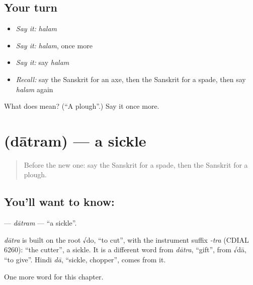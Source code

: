 \subsection*{Your turn}
\begin{itemize}
\raggedright
  \item \emph{Say it:} \emph{halam}
  \item \emph{Say it:} \emph{halam}, once more
  \item \emph{Say it:} say \emph{halam}
  \item \emph{Recall:} say the Sanskrit for an axe, then the Sanskrit for a spade, then say \emph{halam} again
\end{itemize}

\begin{tcolorbox}[breakable,colback=teal!4,colframe=teal!35!black,title={Before you move on}]
What does  mean? (\textquotedblleft{}A plough\textquotedblright{}.) Say it once more.
\end{tcolorbox}
\section[\texorpdfstring{\sk{दात्रम्} (dātram)}{दात्रम् (dātram)}]{ (dātram) — a sickle}

\label{lesson:SA-C218-datram}



\begin{quote}
Before the new one: say the Sanskrit for a spade, then the Sanskrit for a plough.
\end{quote}

\subsection*{You'll want to know: }
\textbf{} — \emph{dātram} — \textquotedblleft{}a sickle\textquotedblright{}.

\begin{cousinweb}
\emph{dātra} is built on the root √do, \textquotedblleft{}to cut\textquotedblright{}, with the instrument suffix \emph{-tra} (CDIAL 6260): \textquotedblleft{}the cutter\textquotedblright{}, a sickle. It is a different word from \emph{dātra}, \textquotedblleft{}gift\textquotedblright{}, from √dā, \textquotedblleft{}to give\textquotedblright{}. Hindi \emph{dā}, \textquotedblleft{}sickle, chopper\textquotedblright{}, comes from it.
\end{cousinweb}

\begin{grammarlens}[title={What you've built}]
One more word for this chapter.
\end{grammarlens}


